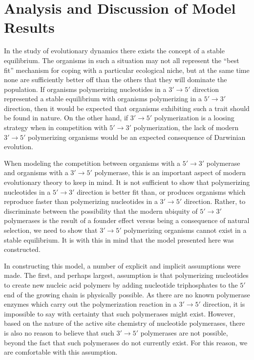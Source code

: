\chapter{Analysis and Discussion of Model Results} %
\label{cha:analysis_of_model_results}
In the study of evolutionary dynamics there exists the concept of a stable equilibrium. The organisms in such a situation may not all represent the ``best fit'' mechanism for coping with a particular ecological niche, but at the same time none are sufficiently better off than the others that they will dominate the population. If organisms polymerizing nucleotides in a $3'\to5'$ direction represented a stable equilibrium with organisms polymerizing in a $5'\to3'$ direction, then it would be expected that organisms exhibiting such a trait should be found in nature. On the other hand, if $3'\to5'$ polymerization is a loosing strategy when in competition with $5'\to3'$ polymerization, the lack of modern $3'\to5'$ polymerizing organisms would be an expected consequence of Darwinian evolution.

When modeling the competition between organisms with a $5'\to3'$ polymerase and organisms with a $3'\to5'$ polymerase, this is an important aspect of modern evolutionary theory to keep in mind. It is not sufficient to show that polymerizing nucleotides in a $5'\to3'$ direction is better fit than, or produces organisms which reproduce faster than polymerizing nucleotides in a $3'\to5'$ direction. Rather, to discriminate between the possibility that the modern ubiquity of $5'\to3'$ polymerases is the result of a founder effect versus being a consequence of natural selection, we need to show that $3'\to5'$ polymerizing organisms cannot exist in a stable equilibrium. It is with this in mind that the model presented here was constructed.

In constructing this model, a number of explicit and implicit assumptions were made. The first, and perhaps largest, assumption is that polymerizing nucleotides to create new nucleic acid polymers by adding nucleotide triphosphates to the $5'$ end of the growing chain is physically possible. As there are no known polymerase enzymes which carry out the polymerization reaction in a $3'\to5'$ direction, it is impossible to say with certainty that such polymerases might exist. However, based on the nature of the active site chemistry of nucleotide polymerases, there is also no reason to believe that such $3'\to5'$ polymerases are not possible, beyond the fact that such polymerases do not currently exist. For this reason, we are comfortable with this assumption.


